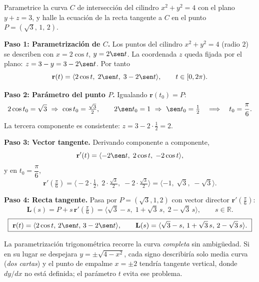 \begin{prob}
Parametrice la curva $C$ de intersección del cilindro $x^2+y^2=4$ con el
plano $y+z=3$, y halle la ecuación de la recta tangente a $C$ en el punto
$P=(\sqrt{3},\,1,\,2)$.
\begin{myproof}
\textbf{Paso 1: Parametrización de $C$.}
Los puntos del cilindro $x^2+y^2=4$ (radio $2$) se describen con
$x=2\cos t$, $y=2\sen t$. La coordenada $z$ queda fijada por el plano:
$z=3-y=3-2\sen t$. Por tanto
\[
  \mathbf{r}(t)=\langle 2\cos t,\; 2\sen t,\; 3-2\sen t\rangle,
  \qquad t\in[0,2\pi).
\]

\textbf{Paso 2: Parámetro del punto $P$.}
Igualando $\mathbf{r}(t_0)=P$:
\[
  2\cos t_0=\sqrt{3}\ \Rightarrow\ \cos t_0=\tfrac{\sqrt3}{2},
  \qquad
  2\sen t_0=1\ \Rightarrow\ \sen t_0=\tfrac12
  \quad\Longrightarrow\quad t_0=\frac{\pi}{6}.
\]
La tercera componente es consistente: $z=3-2\cdot\tfrac12=2$. \checkmark

\textbf{Paso 3: Vector tangente.}
Derivando componente a componente,
\[
  \mathbf{r}'(t)=\langle -2\sen t,\; 2\cos t,\; -2\cos t\rangle,
\]
y en $t_0=\dfrac{\pi}{6}$,
\[
  \mathbf{r}'\!\left(\tfrac{\pi}{6}\right)
  =\big\langle -2\cdot\tfrac12,\; 2\cdot\tfrac{\sqrt3}{2},\;
              -2\cdot\tfrac{\sqrt3}{2}\big\rangle
  =\langle -1,\; \sqrt{3},\; -\sqrt{3}\rangle.
\]

\textbf{Paso 4: Recta tangente.}
Pasa por $P=(\sqrt3,1,2)$ con vector director
$\mathbf{r}'(\tfrac{\pi}{6})$:
\[
  \mathbf{L}(s)=P+s\,\mathbf{r}'\!\left(\tfrac{\pi}{6}\right)
              =\langle \sqrt{3}-s,\; 1+\sqrt{3}\,s,\; 2-\sqrt{3}\,s\rangle,
  \qquad s\in\mathbb{R}.
\]
\[
  \boxed{\ \mathbf{r}(t)=\langle 2\cos t,\, 2\sen t,\, 3-2\sen t\rangle,\qquad
  \mathbf{L}(s)=\langle \sqrt3-s,\, 1+\sqrt3\,s,\, 2-\sqrt3\,s\rangle.\ }
\]
\end{myproof}
\end{prob}

\begin{rem}
La parametrización trigonométrica recorre la curva \emph{completa} sin
ambigüedad. Si en su lugar se despejara $y=\pm\sqrt{4-x^2}$, cada signo
describiría solo media curva (\emph{dos cartas}) y el punto de empalme
$x=\pm2$ tendría tangente vertical, donde $dy/dx$ no está definida; el
parámetro $t$ evita ese problema.
\end{rem}

